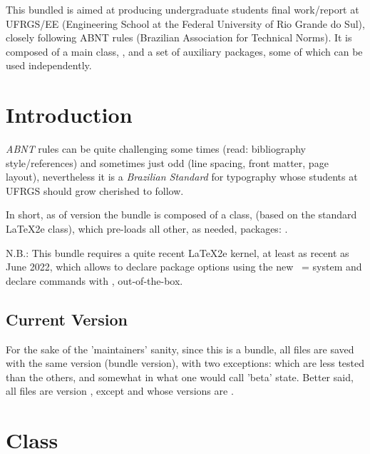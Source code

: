 \documentclass[dctools,english]{ufrgscca} %
\begin{document}
	\dcMakeTitle


	\begin{dcAbstract}
		This bundled is aimed at producing undergraduate students final work/report at UFRGS/EE (Engineering School at the Federal University of Rio Grande do Sul), closely following ABNT rules (Brazilian Association for Technical Norms). It is composed of a main class, , and a set of auxiliary packages, some of which can be used independently.

	\end{dcAbstract}

\tableofcontents

	\section{Introduction}
	\emph{ABNT} rules can be quite challenging some times (read: bibliography style/references) and sometimes just odd (line spacing, front matter, page layout), nevertheless it is a \emph{Brazilian Standard} for typography whose students at UFRGS should grow cherished to follow.

	In short, as of version \ufrgsccaversion\space the bundle is composed of a class,  (based on the standard \LaTeX2e  class), which pre-loads all other, as needed, packages: .

	N.B.: This bundle requires a quite recent \LaTeX2e kernel, at least as recent as June 2022, which allows to declare package options using the new ~= system and declare commands with \Macro{\NewDocumentCommand}{}, out-of-the-box.

\subsection{Current Version}
For the sake of the 'maintainers' sanity, since this is a bundle, all files are saved with the same version (bundle version), with two exceptions:   which are less tested than the others, and somewhat in what one would call 'beta' state. Better said, all files are version \ufrgsccaversion, except  and  whose versions are \ufrgsccacurrversion.

\section{ Class}
\end{document}
